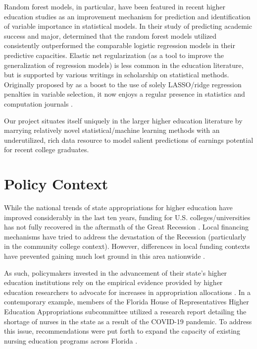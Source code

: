 \documentclass[a4paper, 12pt]{article}
\begin{document}
Random forest models, in particular, have been featured in recent higher education studies as an improvement mechanism for prediction and identification of variable importance in statistical models. In their study of predicting academic success and major, \textcite{beaulacrosenthal_2019} determined that the random forest models utilized consistently outperformed the comparable logistic regression models in their predictive capacities. Elastic net regularization (as a tool to improve the generalization of regression models) is less common in the education literature, but is supported by various writings in scholarship on statistical methods. Originally proposed by \textcite{zouhastie_2005} as a boost to the use of solely LASSO/ridge regression penalties in variable selection, it now enjoys a regular presence in statistics and computation journals \parencite{zouzhang_2009, lilin_2010}.

Our project situates itself uniquely in the larger higher education literature by marrying relatively novel statistical/machine learning methods with an underutilized, rich data resource to model salient predictions of earnings potential for recent college graduates.

\section*{Policy Context}

While the national trends of state appropriations for higher education have improved considerably in the last ten years, funding for U.S. colleges/universities has not fully recovered in the aftermath of the Great Recession \parencite{shef_2021}. Local financing mechanisms have tried to address the devastation of the Recession (particularly in the community college context). However, differences in local funding contexts have prevented gaining much lost ground in this area nationwide \parencite{dowdgrant_2006, cap_2020}.

As such, policymakers invested in the advancement of their state's higher education institutions rely on the empirical evidence provided by higher education researchers to advocate for increases in appropriation allocations \parencite{terenzini_1996}. In a contemporary example, members of the Florida House of Representatives Higher Education Appropriations subcommittee utilized a research report detailing the shortage of nurses in the state as a result of the COVID-19 pandemic. To address this issue, recommendations were put forth to expand the capacity of existing nursing education programs across Florida \parencite{floridahouse_2022, workforce_2021}.
\end{document}

